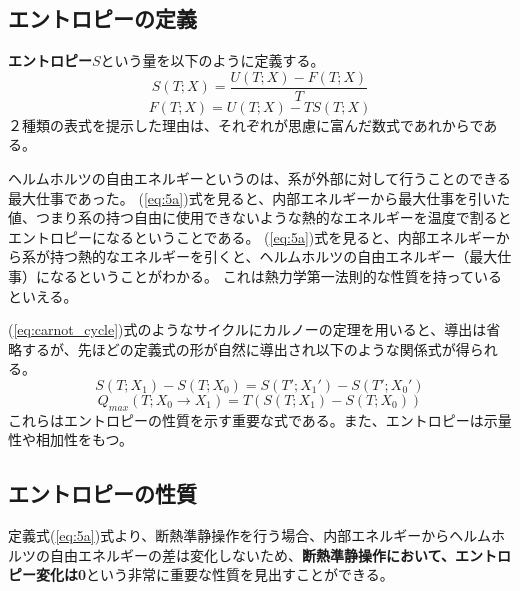 \documentclass[a4paper]{jsreport}
\begin{document}
            \subsection*{エントロピーの定義}
                \textbf{エントロピー}$S$という量を以下のように定義する。
                \begin{equation} \label{eq:5a}
                    S(T; X) = \frac{U(T; X) - F(T; X)}{T}
                \end{equation}
                \begin{equation} \label{eq:5b}
                    F(T; X) = U(T; X) - TS(T; X)
                \end{equation}
                ２種類の表式を提示した理由は、それぞれが思慮に富んだ数式であれからである。\par
                ヘルムホルツの自由エネルギーというのは、系が外部に対して行うことのできる最大仕事であった。
                (\ref{eq:5a})式を見ると、内部エネルギーから最大仕事を引いた値、つまり系の持つ自由に使用できないような熱的なエネルギーを温度で割るとエントロピーになるということである。
                (\ref{eq:5a})式を見ると、内部エネルギーから系が持つ熱的なエネルギーを引くと、ヘルムホルツの自由エネルギー（最大仕事）になるということがわかる。
                これは熱力学第一法則的な性質を持っているといえる。\par
                (\ref{eq:carnot_cycle})式のようなサイクルにカルノーの定理を用いると、導出は省略するが、先ほどの定義式の形が自然に導出され以下のような関係式が得られる。
                \begin{equation} \label{eq:5c}
                    S(T; X_1) - S(T; X_0) = S(T'; X_1') - S(T'; X_0')
                \end{equation}
                \begin{equation} \label{eq:5d}
                    Q_{max}(T; X_0 \xrightarrow{} X_1) = T(S(T; X_1) - S(T; X_0))
                \end{equation}
                これらはエントロピーの性質を示す重要な式である。また、エントロピーは示量性や相加性をもつ。

            \subsection*{エントロピーの性質}
                定義式(\ref{eq:5a})式より、断熱準静操作を行う場合、内部エネルギーからヘルムホルツの自由エネルギーの差は変化しないため、\textbf{断熱準静操作において、エントロピー変化は0}という非常に重要な性質を見出すことができる。
\end{document}
